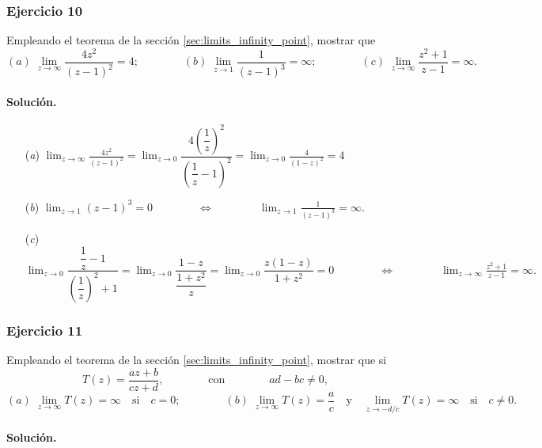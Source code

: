 \documentclass[a4paper]{report}
\begin{document}
\subsubsection{Ejercicio 10} 

Empleando el teorema de la sección \ref{sec:limits_infinity_point}, mostrar que 
\[
 (\textit{a})\;\lim_{z\to\infty}\frac{4z^2}{(z-1)^2}=4;\qquad\qquad 
 (\textit{b})\;\lim_{z\to1}\frac{1}{(z-1)^3}=\infty;\qquad\qquad
 (\textit{c})\;\lim_{z\to\infty}\frac{z^2+1}{z-1}=\infty.
\]

\paragraph{Solución.} 

\begin{enumerate}
 \item[(\textit{a})]
 \(\displaystyle
 \lim_{z\to\infty}\frac{4z^2}{(z-1)^2}=\lim_{z\to0}\dfrac{4\left(\dfrac{1}{z}\right)^2}{\left(\dfrac{1}{z}-1\right)^2}=\lim_{z\to0}\frac{4}{(1-z)^2}=4
 \)
 \item[(\textit{b})]
 \(\displaystyle
  \lim_{z\to1}(z-1)^3=0
  \qquad\qquad\Leftrightarrow\qquad\qquad
  \lim_{z\to1}\frac{1}{(z-1)^3}=\infty.
 \)
 \item[(\textit{c})]
 \(\displaystyle
  \lim_{z\to0}\dfrac{\dfrac{1}{z}-1}{\left(\dfrac{1}{z}\right)^2+1}
  =\lim_{z\to0}\dfrac{1-z}{\dfrac{1+z^2}{z}}
  =\lim_{z\to0}\dfrac{z(1-z)}{1+z^2}=0
  \qquad\qquad\Leftrightarrow\qquad\qquad
  \lim_{z\to\infty}\frac{z^2+1}{z-1}=\infty.
 \)
\end{enumerate} 

\subsubsection{Ejercicio 11} 

Empleando el teorema de la sección \ref{sec:limits_infinity_point}, mostrar que si
\[
 T(z)=\frac{az+b}{cz+d},
 \qquad\qquad\textrm{con}\qquad\qquad
 ad-bc\neq0,
\]
\[
 (\textit{a})\;\lim_{z\to\infty}T(z)=\infty\quad\textrm{si}\quad c=0;\qquad\qquad
 (\textit{b})\;\lim_{z\to\infty}T(z)=\frac{a}{c}\quad\textrm{y}\quad\lim_{z\to-d/c}T(z)=\infty\quad\textrm{si}\quad c\neq0.
\]

\paragraph{Solución.} 
\end{document}
